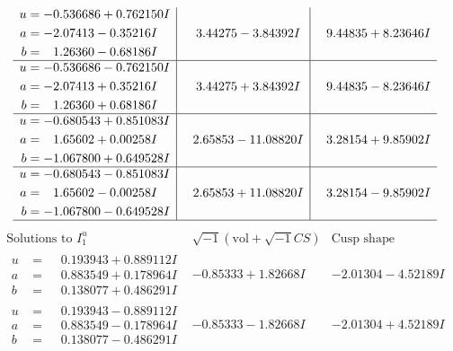 \documentclass[1p]{elsarticle_modified}
\theoremstyle{definition}
\newcommand{\I}{\sqrt{-1}}
\begin{document}
$$\begin{array}{c|c|c}
\begin{aligned}
u &= -0.536686 + 0.762150 I \\
a &= -2.07413 - 0.35216 I \\
b &= \phantom{-}1.26360 - 0.68186 I\end{aligned}
 & \phantom{-}3.44275 - 3.84392 I & \phantom{-}9.44835 + 8.23646 I \\ \hline\begin{aligned}
u &= -0.536686 - 0.762150 I \\
a &= -2.07413 + 0.35216 I \\
b &= \phantom{-}1.26360 + 0.68186 I\end{aligned}
 & \phantom{-}3.44275 + 3.84392 I & \phantom{-}9.44835 - 8.23646 I \\ \hline\begin{aligned}
u &= -0.680543 + 0.851083 I \\
a &= \phantom{-}1.65602 + 0.00258 I \\
b &= -1.067800 + 0.649528 I\end{aligned}
 & \phantom{-}2.65853 - 11.08820 I & \phantom{-}3.28154 + 9.85902 I \\ \hline\begin{aligned}
u &= -0.680543 - 0.851083 I \\
a &= \phantom{-}1.65602 - 0.00258 I \\
b &= -1.067800 - 0.649528 I\end{aligned}
 & \phantom{-}2.65853 + 11.08820 I & \phantom{-}3.28154 - 9.85902 I\\
 \hline 
 \end{array}$$\newpage$$\begin{array}{c|c|c}  
\text{Solutions to }I^u_{1}& \I (\text{vol} + \sqrt{-1}CS) & \text{Cusp shape}\\
 \hline 
\begin{aligned}
u &= \phantom{-}0.193943 + 0.889112 I \\
a &= \phantom{-}0.883549 + 0.178964 I \\
b &= \phantom{-}0.138077 + 0.486291 I\end{aligned}
 & -0.85333 + 1.82668 I & -2.01304 - 4.52189 I \\ \hline\begin{aligned}
u &= \phantom{-}0.193943 - 0.889112 I \\
a &= \phantom{-}0.883549 - 0.178964 I \\
b &= \phantom{-}0.138077 - 0.486291 I\end{aligned}
 & -0.85333 - 1.82668 I & -2.01304 + 4.52189 I \\ \hline\begin{aligned}

\end{aligned}
\end{array}$$
\end{document}
